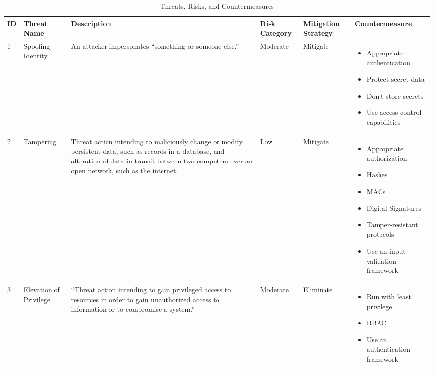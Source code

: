 \documentclass [11pt]{article}
\begin{document}
\begin{table}[H]
\centering
\begin{tabular}{|p{0.6cm}|p{2cm}|p{4.5cm}|p{1.8cm}|p{2cm}|p{4.5cm}|}
\hline
\textbf{ID} & \textbf{Threat Name} & \textbf{Description} & \textbf{Risk Category} & \textbf{Mitigation Strategy} & \textbf{Countermeasure} \\
\hline
1 & Spoofing Identity & An attacker impersonates “something or someone else.” & Moderate & Mitigate & 
\begin{itemize}
    \item Appropriate authentication
    \item Protect secret data
    \item Don’t store secrets
    \item Use access control capabilities
\end{itemize} \\
\hline
2 & Tampering & Threat action intending to maliciously change or modify persistent data, such as records in a database, and alteration of data in transit between two computers over an open network, such as the internet. & Low & Mitigate & 
\begin{itemize}
    \item Appropriate authorization
    \item Hashes
    \item MACs
    \item Digital Signatures
    \item Tamper-resistant protocols
    \item Use an input validation framework
\end{itemize} \\
\hline
3 & Elevation of Privilege & “Threat action intending to gain privileged access to resources in order to gain unauthorized access to information or to compromise a system.” & Moderate & Eliminate & 
\begin{itemize}
    \item Run with least privilege
    \item RBAC
    \item Use an authentication framework
\end{itemize} \\
\hline
\end{tabular}
\caption{Threats, Risks, and Countermeasures}
\end{table}



\subsection{}
\end{document}

